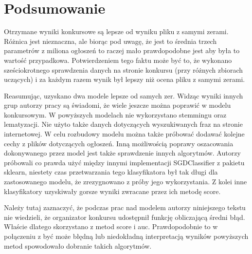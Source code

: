 \documentclass[a4paper,11pt]{article}
\begin{document}
\section{Podsumowanie}

Otrzymane wyniki konkursowe są lepsze od wyniku pliku z samymi zerami. Różnica jest nieznaczna, ale biorąc pod uwagę, że jest to średnia trzech parametrów z miliona ogłoszeń to raczej mało prawdopodobne jest aby była to wartość przypadkowa. Potwierdzeniem tego faktu może być to, że wykonano sześciokrotnego sprawdzenia danych na stronie konkursu (przy różnych zbiorach uczących) i za każdym razem wynik był lepszy niż ocena pliku z samymi zerami. 

Reasumując, uzyskano dwa modele lepsze od samych zer. Widząc wyniki innych grup autorzy pracy są świadomi, że wiele jeszcze można poprawić w modelu konkursowym. W powyższych modelach nie wykorzystano stemmingu oraz lematyzacji. Nie użyto także danych dotyczących wyszukiwanych fraz na stronie internetowej. W celu rozbudowy modelu można także próbować dodawać kolejne cechy z plików dotyczących ogłoszeń. Inną możliwością poprawy oszacowania dokonywanego przez model jest także sprawdzenie innych algorytmów. Autorzy próbowali co prawda użyć między innymi implementacji SGDClassifier z pakietu sklearn, niestety czas przetwarzania tego klasyfikatora był tak długi dla zastosowanego modelu, że zrezygnowano z próby jego wykorzystania. Z kolei inne klasyfikatory uzyskiwały gorsze wyniki zwracane przez ich metodę score. 

Należy tutaj zaznaczyć, że podczas prac nad modelem autorzy niniejszego tekstu nie wiedzieli, że organizator konkursu udostępnił funkcję obliczającą średni błąd. Właście dlatego skorzystano z metod score i auc. Prawdopodobnie to w połączeniu z być może błędną lub niedokładną interpretacją wyników powyższych metod spowodowało dobranie takich algorytmów.
\end{document}
